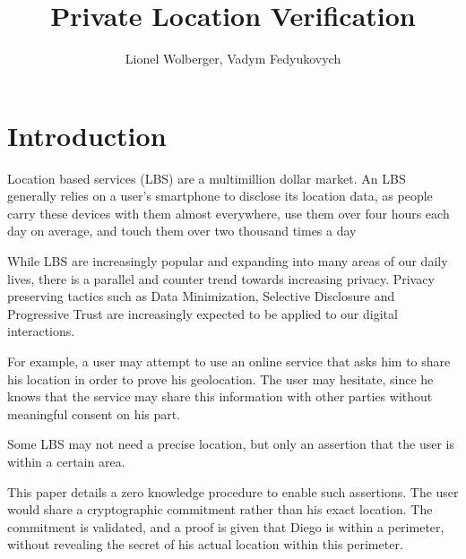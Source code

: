 \documentclass{article}
\begin{document}
\title{Private Location Verification}
\author{Lionel Wolberger, Vadym Fedyukovych}
\maketitle

\section{Introduction}

Location based services (LBS) are a multimillion dollar market.
An LBS generally relies on a user's smartphone to disclose its location data, as people carry these devices with them almost everywhere, 
use them over four hours each day on average, 
and touch them over two thousand times a day ~\cite{dscout}

While LBS are increasingly popular and expanding into many areas of our daily lives,
there is a  parallel and counter trend towards increasing privacy. 
Privacy preserving tactics such as Data Minimization, Selective Disclosure and Progressive Trust are increasingly expected to be applied to our digital interactions. ~\cite{CCGMDSDPT}

For example, a user may attempt to use an online service that asks him to share his location in order to prove his geolocation.
The user may hesitate, since he knows that the service may share this information with other parties without meaningful consent on his part. 

Some LBS may not need a precise location, but only an assertion that the user is within a certain area. 

This paper details a zero knowledge procedure to enable such assertions. 
The user would share a cryptographic commitment rather than his exact location. 
The commitment is validated, 
and a proof is given that Diego is within a perimeter, 
without revealing the secret of his actual location within this perimeter. 
\end{document}
